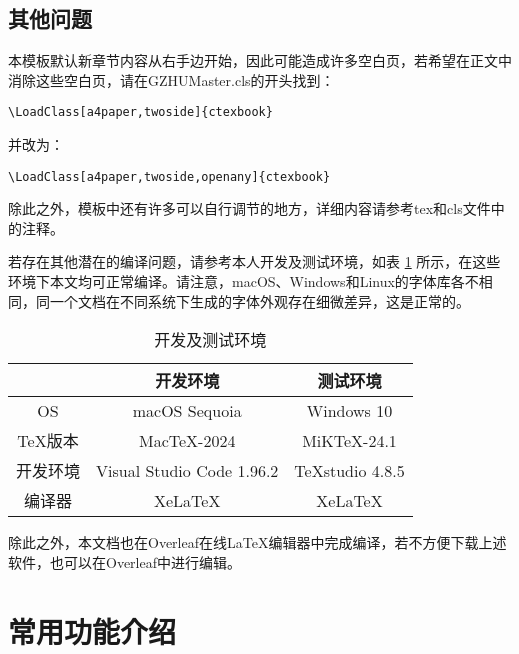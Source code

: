 \documentclass{GZHUMaster}
\begin{document}
\section{其他问题}
本模板默认新章节内容从右手边开始，因此可能造成许多空白页，若希望在正文中消除这些空白页，请在GZHUMaster.cls的开头找到：\par
\verb|\LoadClass[a4paper,twoside]{ctexbook}|\par
并改为：\par
\verb|\LoadClass[a4paper,twoside,openany]{ctexbook}|\par
除此之外，模板中还有许多可以自行调节的地方，详细内容请参考tex和cls文件中的注释。\par
若存在其他潜在的编译问题，请参考本人开发及测试环境，如表 \ref{tab1} 所示，在这些环境下本文均可正常编译。请注意，macOS、Windows和Linux的字体库各不相同，同一个文档在不同系统下生成的字体外观存在细微差异，这是正常的。\par
\begin{table}[h]
  \centering
  \caption{开发及测试环境}
  \begin{tabular}{ccc}
    \hline
    & 开发环境 & 测试环境 \\
    \hline
    OS & macOS Sequoia & Windows 10 \\
    TeX版本 & MacTeX-2024 & MiKTeX-24.1 \\
    开发环境 & Visual Studio Code 1.96.2 & TeXstudio 4.8.5 \\
    编译器 & XeLaTeX & XeLaTeX \\
    \hline
  \end{tabular}
  \label{tab1}
\end{table}
除此之外，本文档也在Overleaf在线LaTeX编辑器中完成编译，若不方便下载上述软件，也可以在Overleaf中进行编辑。
\chapter{常用功能介绍}
\end{document}
